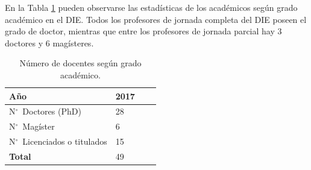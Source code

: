 
En la Tabla \ref{docentes_grados} pueden observarse las estadísticas de los académicos según grado académico
en el DIE. Todos los profesores de jornada completa del DIE poseen el grado de doctor, mientras
que entre los profesores de jornada parcial hay 3 doctores y 6 magísteres.

\begin{table}[ht]
\centering
\caption{Número de docentes según grado académico.}
\label{docentes_grados}
\begin{tabular}{llll}
\hline
Año                        			& 2017 \\ \hline \hline %
N$^\circ$~Doctores (PhD)        	& 28 \\ %
N$^\circ$~Magíster              	& 6 \\ %
N$^\circ$~Licenciados o titulados 	& 15 \\ %
\textbf{Total}             			& 49 \\ %
\end{tabular}
\end{table}

